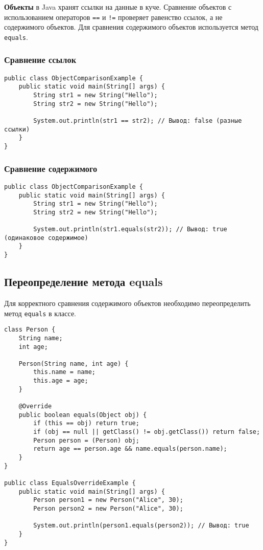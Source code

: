 \documentclass[12pt, a4paper]{article}
\begin{document}
\textbf{Объекты} в Java хранят ссылки на данные в куче. Сравнение объектов с использованием операторов \texttt{==} и \texttt{!=} проверяет равенство ссылок, а не содержимого объектов. Для сравнения содержимого объектов используется метод \texttt{equals}.

\subsubsection*{Сравнение ссылок}
\begin{verbatim}
public class ObjectComparisonExample {
    public static void main(String[] args) {
        String str1 = new String("Hello");
        String str2 = new String("Hello");

        System.out.println(str1 == str2); // Вывод: false (разные ссылки)
    }
}
\end{verbatim}

\subsubsection*{Сравнение содержимого}
\begin{verbatim}
public class ObjectComparisonExample {
    public static void main(String[] args) {
        String str1 = new String("Hello");
        String str2 = new String("Hello");

        System.out.println(str1.equals(str2)); // Вывод: true (одинаковое содержимое)
    }
}
\end{verbatim}

\subsection*{Переопределение метода equals}
Для корректного сравнения содержимого объектов необходимо переопределить метод \texttt{equals} в классе.

\begin{verbatim}
class Person {
    String name;
    int age;

    Person(String name, int age) {
        this.name = name;
        this.age = age;
    }

    @Override
    public boolean equals(Object obj) {
        if (this == obj) return true;
        if (obj == null || getClass() != obj.getClass()) return false;
        Person person = (Person) obj;
        return age == person.age && name.equals(person.name);
    }
}

public class EqualsOverrideExample {
    public static void main(String[] args) {
        Person person1 = new Person("Alice", 30);
        Person person2 = new Person("Alice", 30);

        System.out.println(person1.equals(person2)); // Вывод: true
    }
}
\end{verbatim}
\end{document}
